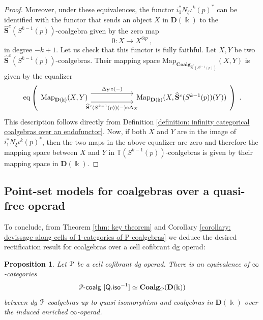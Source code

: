 \documentclass[a4paper,12pt]{amsart}
\renewcommand{\mathcal}{\EuScript}
\theoremstyle{plain}
\newtheorem{proposition}[theorem]{Proposition}%
\theoremstyle{definition}
\theoremstyle{remark}
\newcommand{\kk}{\Bbbk}
\begin{document}
\begin{proof}
 Moreover, under these equivalences, the functor $i_1^*N_{\xi}\iota^k(p)^*$ can be identified with the functor that sends an object $X$ in $\mathbf{D}(\kk)$ to the $\widehat{\mathbf{S}}^c(S^{k-1}(p))$-coalgebra given by the zero map 
\[
0: X \longrightarrow X^{\otimes p}~, 
\]
in degree $-k+1$. Let us check that this functor is fully faithful. Let $X,Y$ be two $\widehat{\mathbf{S}}^c(S^{k-1}(p))$-coalgebras. Their mapping space $\mathrm{Map}_{\mathbf{Coalg}_{\widehat{\mathbf{S}}^c(S^{k-1}(p))}}(X,Y)$ is given by the equalizer
\[\operatorname{eq}\left( 
\begin{tikzcd}[column sep = 5pc]
\mathrm{Map}_{\mathbf{D}(\kk)}(X,Y) \arrow[r,shift left=0.5pc,"\Delta_Y \circ (-)"]\arrow[r,shift right=0.5pc,"\widehat{\mathbf{S}}^c(S^{k-1}(p))(-) \circ \Delta_X",swap]
&\mathrm{Map}_{\mathbf{D}(\kk)}(X,\widehat{\mathbf{S}}^c(S^{k-1}(p))(Y))
\end{tikzcd}\right)~.
\]
This description follows directly from Definition \ref{definition: infinity categorical coalgebras over an endofunctor}. Now, if both $X$ and $Y$ are in the image of $i_1^*N_{\xi}\iota^k(p)^*$, then the two maps in the above equalizer are zero and therefore the mapping space between $X$ and $Y$ in $\mathbb{T}(S^{k-1}(p))$-coalgebras is given by their mapping space in $\mathbf{D}(\kk)$.
\end{proof}

\subsection{Point-set models for coalgebras over a quasi-free operad}

To conclude, from Theorem \ref{thm: key theorem} and Corollary \ref{corollary: devissage along cells of 1-categories of P-coalgebras} we deduce the desired rectification result for coalgebras over a cell cofibrant dg operad:
\begin{proposition}\label{prop: rectification for cell cofibrant operads}
Let $\mathcal{P}$ be a cell cofibrant dg operad. There is an equivalence of $\infty$-categories
\[
\mathcal{P}\text{-}\mathsf{coalg}~[\mathsf{Q.iso}^{-1}] \simeq \mathbf{Coalg}_{\mathcal{P}}(\mathbf{D}(\kk))
\]
between dg $\mathcal{P}$-coalgebras up to quasi-isomorphism and coalgebras in $\mathbf{D}(\kk)$ over the induced enriched $\infty$-operad. 
\end{proposition}
\end{document}
